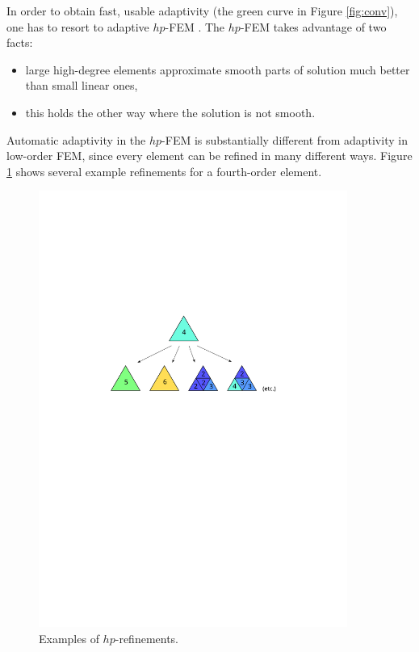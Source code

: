 \documentclass[11pt]{article}
\begin{document}
In order to obtain fast, usable adaptivity (the green curve in Figure \ref{fig:conv}), one
has to resort to adaptive $hp$-FEM \cite{solin1}. The $hp$-FEM takes advantage of two
facts:

\begin{itemize}
\item large high-degree elements approximate smooth parts of solution much
better than small linear ones,
\item this holds the other way where the solution is not smooth.
\end{itemize}

Automatic adaptivity in the $hp$-FEM is substantially different from adaptivity
in low-order FEM, since every element can be refined in many different ways.
Figure \ref{fig:refinements} shows several example refinements for a fourth-order element.

\begin{figure}[!ht]
  \medskip \centering
  \includegraphics[width=0.9\textwidth]{img/refinements}
  \caption{Examples of $hp$-refinements.}
  \label{fig:refinements}
\end{figure}
\end{document}
